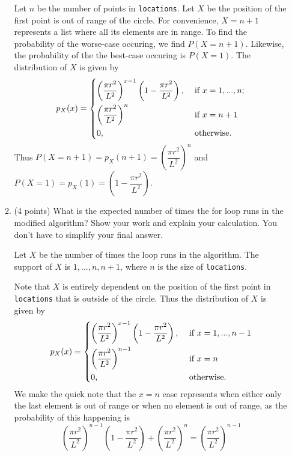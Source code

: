 \documentclass{assignment-263}
\begin{document}
\begin{enumerate}
\begin{enumerate}
    Let \(n\) be the number of points in \verb|locations|. Let \(X\) be the position of the first point is out of range of the circle. For convenience, \(X = n + 1\) represents a list where all its elements are in range. To find the probability of the worse-case occuring, we find \(P(X = n + 1)\). Likewise, the probability of the the best-case occuring is \(P(X = 1)\). The distribution of \(X\) is given by
    \[
      p_X(x) = \begin{dcases}
        \left( \dfrac{\pi r^2}{L^2} \right)^{x-1} \left( 1 - \dfrac{\pi r^2}{L^2} \right), &\text{ if } x = 1, ..., n ;\\
        \left( \dfrac{\pi r^2}{L^2} \right)^{n} &\text{ if } x = n + 1 \\
        0, &\text{ otherwise} .
      \end{dcases}
    \]
    Thus \(P(X = n + 1) = p_X(n + 1) = \left( \dfrac{\pi r^2}{L^2} \right)^{n}\) and \(P(X = 1) = p_X(1) = \left( 1 - \dfrac{\pi r^2}{L^2} \right)\).


    \item (4 points) What is the expected number of times the for loop runs in the modified algorithm? Show your work and explain your calculation. You don't have to simplify your final answer.
    
    Let \(X\) be the number of times the loop runs in the algorithm. The support of \(X\) is \(1, ..., n, n + 1\), where \(n\) is the size of \verb|locations|.

    Note that \(X\) is entirely dependent on the position of the first point in \verb|locations| that is outside of the circle. Thus the distribution of \(X\) is given by
    \[
      p_X(x) = \begin{dcases}
        \left( \dfrac{\pi r^2}{L^2} \right)^{x-1} \left( 1 - \dfrac{\pi r^2}{L^2} \right), &\text{ if } x = 1, ..., n - 1 \\
        \left( \dfrac{\pi r^2}{L^2} \right)^{n-1} &\text{ if } x = n \\
        0, &\text{ otherwise} .
      \end{dcases}
    \]
    We make the quick note that the \(x = n\) case represents when either only the last element is out of range or when no element is out of range, as the probability of this happening is
    \[
      \left( \dfrac{\pi r^2}{L^2} \right)^{n-1} \left( 1 - \dfrac{\pi r^2}{L^2} \right) + \left( \dfrac{\pi r^2}{L^2} \right)^{n} = \left( \dfrac{\pi r^2}{L^2} \right)^{n-1}
    \]


\end{enumerate}
\end{enumerate}
\end{document}
